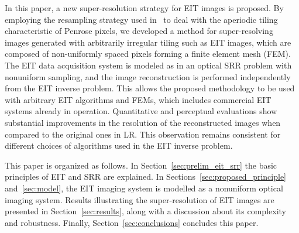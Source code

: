 \documentclass[10pt]{IEEEtran}
\newcommand{\cblue}{}
\newcommand{\ccyan}{\textcolor{cyan}}
\begin{document}
In this paper, a new super-resolution strategy for EIT images is proposed.
%
By employing the resampling strategy used in~\cite{Ben11} to deal with the aperiodic tiling characteristic of Penrose pixels, we developed a method for super-resolving images generated with arbitrarily irregular tiling such as EIT images, which are composed of non-uniformly spaced pixels forming a finite element mesh (FEM).
%
The EIT data acquisition system is modeled as in an optical SRR problem with nonuniform sampling, and the image reconstruction is performed independently from the EIT inverse problem. This allows the proposed methodology to be used with arbitrary EIT algorithms and FEMs, which includes commercial EIT systems already in operation.
%
Quantitative and perceptual evaluations show substantial improvements in the resolution of the reconstructed images when compared to the original ones in LR. This observation remains consistent for different choices of algorithms used in the EIT inverse problem.









This paper is organized as follows. In Section~\ref{sec:prelim_eit_srr} the basic principles of EIT and SRR are explained. In Sections~\ref{sec:proposed_principle} and~\ref{sec:model}, the EIT imaging system is modelled as a nonuniform optical imaging system. Results illustrating the super-resolution of EIT \cblue{images are presented in Section~\ref{sec:results}, along with a discussion about its complexity and robustness.} Finally, Section~\ref{sec:conclusions} concludes this paper.



%
\end{document}
